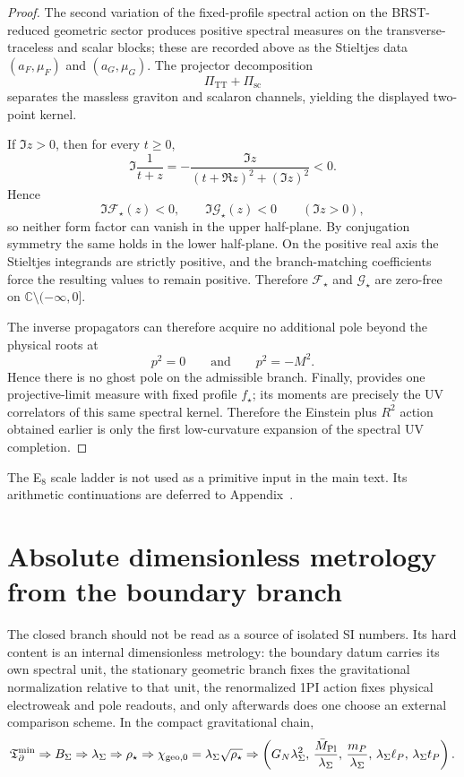 \begin{proof}
The second variation of the fixed-profile spectral action on the BRST-reduced geometric sector
produces positive spectral measures on the transverse-traceless and scalar blocks; these are
recorded above as the Stieltjes data $(a_F,\mu_F)$ and $(a_G,\mu_G)$. The projector decomposition
\[
\Pi_{\mathrm{TT}}+\Pi_{\mathrm{sc}}
\]
separates the massless graviton and scalaron channels, yielding the displayed two-point kernel.

If $\Im z>0$, then for every $t\ge 0$,
\[
\Im\frac{1}{t+z}
=
-\frac{\Im z}{(t+\Re z)^2+(\Im z)^2}
<0.
\]
Hence
\[
\Im \mathcal F_\star(z)<0,
\qquad
\Im \mathcal G_\star(z)<0
\qquad
(\Im z>0),
\]
so neither form factor can vanish in the upper half-plane. By conjugation symmetry the same holds
in the lower half-plane. On the positive real axis the Stieltjes integrands are strictly positive,
and the branch-matching coefficients force the resulting values to remain positive. Therefore
$\mathcal F_\star$ and $\mathcal G_\star$ are zero-free on
$\mathbb C\setminus(-\infty,0]$.

The inverse propagators can therefore acquire no additional pole beyond the physical roots at
\[
p^2=0
\qquad\text{and}\qquad
p^2=-M^2.
\]
Hence there is no ghost pole on the admissible branch. Finally,
 provides one projective-limit measure with fixed profile
$f_\star$; its moments are precisely the UV correlators of this same spectral kernel. Therefore the
Einstein plus $R^2$ action obtained earlier is only the first low-curvature expansion of the
spectral UV completion.
\end{proof}

The E$_8$ scale ladder is not used as a primitive input in the main text. Its arithmetic
continuations are deferred to Appendix~.


\section{Absolute dimensionless metrology from the boundary branch}
\label{sec:absolute-dimensionless-metrology}

The closed branch should not be read as a source of isolated SI numbers. Its hard content is an
internal dimensionless metrology: the boundary datum carries its own spectral unit, the stationary
geometric branch fixes the gravitational normalization relative to that unit, the renormalized 1PI
action fixes physical electroweak and pole readouts, and only afterwards does one choose an
external comparison scheme.
In the compact gravitational chain,
\[
\mathfrak T_{\partial}^{\min}
\Rightarrow
B_\Sigma
\Rightarrow
\lambda_\Sigma
\Rightarrow
\rho_\star
\Rightarrow
\chi_{\mathrm{geo},0}=\lambda_\Sigma\sqrt{\rho_\star}
\Rightarrow
\left(
G_N\lambda_\Sigma^2,\,
\frac{\bar M_{\mathrm{Pl}}}{\lambda_\Sigma},\,
\frac{m_P}{\lambda_\Sigma},\,
\lambda_\Sigma\ell_P,\,
\lambda_\Sigma t_P
\right).
\]

